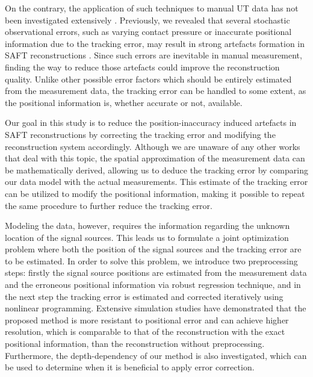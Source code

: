 On the contrary, the application of such techniques to manual UT data has not been investigated extensively \cite{Krieg18SHMNDT, Mayer16SAFTwithSmallData}. Previously, we revealed that several stochastic observational errors, such as varying contact pressure or inaccurate positional information due to the tracking error, may result in strong artefacts formation in SAFT reconstructions \cite{Krieg19IUS}. Since such errors are inevitable in manual measurement, finding the way to reduce those artefacts could improve the reconstruction quality. Unlike other possible error factors which should be entirely estimated from the measurement data, the tracking error can be handled to some extent, as the positional information is, whether accurate or not, available. \par

Our goal in this study is to reduce the position-inaccuracy induced artefacts in SAFT reconstructions by correcting the tracking error and modifying the reconstruction system accordingly. Although we are unaware of any other works that deal with this topic, the spatial approximation of the measurement data can be mathematically derived, allowing us to deduce the tracking error by comparing our data model with the actual measurements. This estimate of the tracking error can be utilized to modify the positional information, making it possible to repeat the same procedure to further reduce the tracking error. \par

Modeling the data, however, requires the information regarding the unknown location of the signal sources. This leads us to formulate a joint optimization problem where both the position of the signal sources and the tracking error are to be estimated. In order to solve this problem, we introduce two preprocessing steps: firstly the signal source positions are estimated from the measurement data and the erroneous positional information via robust regression technique, and in the next step the tracking error is estimated and corrected iteratively using nonlinear programming. Extensive simulation studies have demonstrated that the proposed method is more resistant to positional error and can achieve higher resolution, which is comparable to that of the reconstruction with the exact positional information, than the reconstruction without preprocessing. Furthermore, the depth-dependency of our method is also investigated, which can be used to determine when it is beneficial to apply error correction.